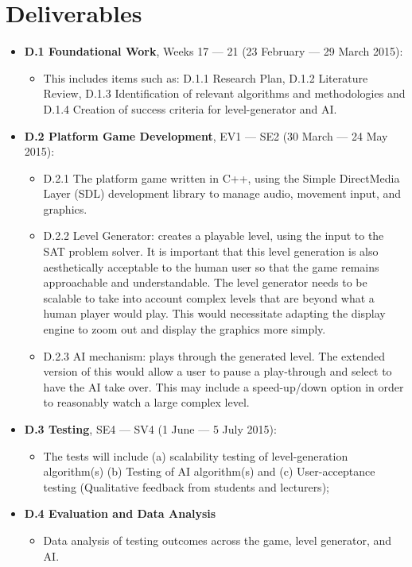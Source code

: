 \documentclass[a4paper]{article}
\begin{document}
\section{Deliverables}
\begin{itemize}
  \item \textbf{D.1 Foundational Work}, Weeks 17 --- 21 (23 February --- 29 March 2015):

    \begin{itemize} 
      \item This includes items such as: D.1.1 Research Plan, D.1.2 Literature Review, D.1.3 Identification of relevant algorithms and methodologies and D.1.4 Creation of success criteria for level-generator and AI.
    \end{itemize}
  \item \textbf{D.2 Platform Game Development}, EV1 --- SE2 (30 March --- 24 May 2015): 
    \begin{itemize} 
      \item D.2.1 The platform game written in C++, using the Simple DirectMedia Layer (SDL) development library to manage audio, movement input, and graphics.
      \item D.2.2 Level Generator: creates a playable level, using the input to the SAT problem solver. It is important that this level generation is also aesthetically acceptable to the human user so that the game remains approachable and understandable. The level generator needs to be scalable to take into account complex levels that are beyond what a human player would play. This would necessitate adapting the display engine to zoom out and display the graphics more simply. 
      \item D.2.3 AI mechanism: plays through the generated level. The extended version of this would allow a user to pause a play-through and select to have the AI take over. This may include a speed-up/down option in order to reasonably watch a large complex level. 
    \end{itemize}
  \item \textbf{D.3 Testing}, SE4 --- SV4 (1 June --- 5 July 2015):
      \begin{itemize} 
      \item The tests will include (a) scalability testing of level-generation algorithm(s) (b) Testing of AI algorithm(s) and (c) User-acceptance testing (Qualitative feedback from students and lecturers);
    \end{itemize}
  \item \textbf{D.4 Evaluation and Data Analysis}
      \begin{itemize} 
      \item Data analysis of testing outcomes across the game, level generator, and AI.
    \end{itemize}
\end{itemize}
\end{document}
